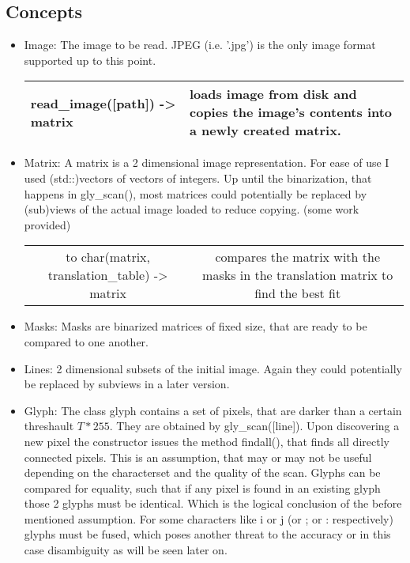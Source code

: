 \documentclass[12pt]{scrartcl}
\begin{document}
  \subsection{Concepts}
\begin{itemize}
\item Image: The image to be read. JPEG (i.e. '.jpg') is the only image format supported up to this point.\newline
\begin{tabular}{ m{6cm} m{7cm} }
\hline
read\_image([path]) -> matrix & loads image from disk and copies the image's contents into a newly created matrix.\\
\hline
\end{tabular}


\item Matrix: A matrix is a 2 dimensional image representation. For ease of use I used (std::)vectors of vectors of integers. Up until the binarization, that happens in gly\_scan(), most matrices could potentially be replaced by (sub)views of the actual image loaded to reduce copying. (some work provided)\newline
\begin{tabular}{c c}
to char(matrix, translation\_table) -> matrix & compares the matrix with the masks in the translation matrix to find the best fit 
\end{tabular} 

\item Masks: Masks are binarized matrices of fixed size, that are ready to be compared to one another.\newline

\item Lines: 2 dimensional subsets of the initial image. Again they could potentially be replaced by subviews in a later version.\newline

\item Glyph: The class glyph contains a set of pixels, that are darker than a certain threshault $T*255$. They are obtained by gly\_scan([line]). Upon discovering a new pixel the constructor issues the method findall(), that finds all directly connected pixels. This is an assumption, that may or may not be useful depending on the characterset and the quality of the scan.\newline
Glyphs can be compared for equality, such that if any pixel is found in an existing glyph those 2 glyphs must be identical. Which is the logical conclusion of the before mentioned assumption.\newline
For some characters like i or j (or ; or : respectively) glyphs must be fused, which poses another threat to the accuracy or in this case disambiguity as will be seen later on.\newline


\end{itemize}
\end{document}
